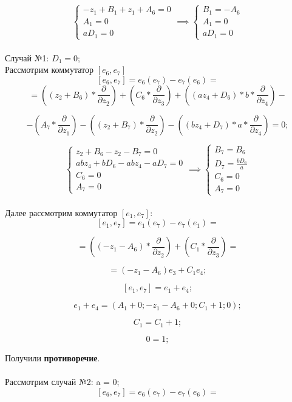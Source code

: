 \documentclass[12pt]{article}
\begin{document}
\[
\begin{cases}
-z_1 + B_1 + z_1 + A_6 = 0 \\
A_1 = 0 \\
aD_1 = 0
\end{cases}
\implies
\begin{cases}
B_1 = -A_6 \\
A_1 = 0 \\
aD_1 = 0
\end{cases}
\]\\

Случай №1: $D_1 = 0$; \\
Рассмотрим коммутатор $[e_6, e_7]$
\[
[e_6, e_7] = e_6(e_7) - e_7(e_6) = 
\]
\[
= \left((z_2 + B_6) * \frac{\partial}{\partial z_2}\right)
+ \left(C_6 * \frac{\partial}{\partial z_3}\right)
+ \left((az_4 + D_6) * b * \frac{\partial}{\partial z_4}\right) - 
\]

\[
- \left(A_7 * \frac{\partial}{\partial z_1}\right)
- \left((z_2 + B_7) * \frac{\partial}{\partial z_2}\right)
- \left((bz_4 + D_7) * a * \frac{\partial}{\partial z_4}\right) = 0;
\]

\[
\begin{cases}
z_2 + B_6 - z_2 - B_7 = 0 \\
abz_4 + bD_6 - abz_4 - aD_7 = 0 \\
C_6 = 0 \\
A_7 = 0
\end{cases}
\implies
\begin{cases}
B_7 = B_6 \\
D_7 = \frac{bD_6}{a} \\
C_6 = 0 \\
A_7 = 0
\end{cases}
\]\\

Далее рассмотрим коммутатор $[e_1, e_7]$: 
\[
[e_1, e_7] = e_1(e_7) - e_7(e_1) = 
\]

\[
= \left((-z_1 - A_6) * \frac{\partial}{\partial z_2}\right)
+ \left(C_1 * \frac{\partial}{\partial z_3}\right) =
\]

\[
= (-z_1 - A_6)e_3 + C_1e_4;
\]

\[
[e_1, e_7] = e_1 + e_4;
\]

\[
e_1 + e_4 = \left(A_1 + 0; -z_1 - A_6 + 0; C_1 + 1; 0 \right);
\]

\[
C_1 = C_1 + 1;
\]

\[
0 = 1;
\]

Получили \textbf{противоречие}.\\\\
Рассмотрим случай №2: a = 0;
\[
[e_6, e_7] = e_6(e_7) - e_7(e_6) = 
\]
\end{document}
